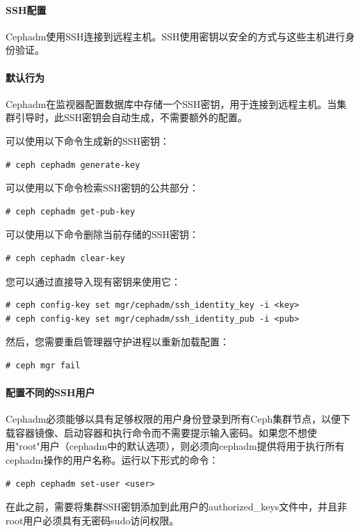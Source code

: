 \documentclass[12pt,UTF8]{ctexbook}
\begin{document}
\paragraph{SSH配置}

Cephadm使用SSH连接到远程主机。SSH使用密钥以安全的方式与这些主机进行身份验证。

\paragraph{默认行为}

Cephadm在监视器配置数据库中存储一个SSH密钥，用于连接到远程主机。当集群引导时，此SSH密钥会自动生成，不需要额外的配置。

可以使用以下命令生成新的SSH密钥：
\begin{verbatim}
# ceph cephadm generate-key
\end{verbatim}

可以使用以下命令检索SSH密钥的公共部分：
\begin{verbatim}
# ceph cephadm get-pub-key
\end{verbatim}

可以使用以下命令删除当前存储的SSH密钥：
\begin{verbatim}
# ceph cephadm clear-key
\end{verbatim}

您可以通过直接导入现有密钥来使用它：
\begin{verbatim}
# ceph config-key set mgr/cephadm/ssh_identity_key -i <key>
# ceph config-key set mgr/cephadm/ssh_identity_pub -i <pub>
\end{verbatim}

然后，您需要重启管理器守护进程以重新加载配置：
\begin{verbatim}
# ceph mgr fail
\end{verbatim}

\paragraph{配置不同的SSH用户}

Cephadm必须能够以具有足够权限的用户身份登录到所有Ceph集群节点，以便下载容器镜像、启动容器和执行命令而不需要提示输入密码。如果您不想使用"root"用户（cephadm中的默认选项），则必须向cephadm提供将用于执行所有cephadm操作的用户名称。运行以下形式的命令：
\begin{verbatim}
# ceph cephadm set-user <user>
\end{verbatim}

在此之前，需要将集群SSH密钥添加到此用户的authorized_keys文件中，并且非root用户必须具有无密码sudo访问权限。
\end{document}
